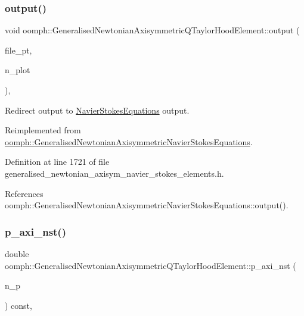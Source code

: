 \subsubsection{\texorpdfstring{output()}{output()}\hspace{0.1cm}{\footnotesize\ttfamily [4/4]}}
{\footnotesize\ttfamily void oomph\+::\+Generalised\+Newtonian\+Axisymmetric\+Q\+Taylor\+Hood\+Element\+::output (\begin{DoxyParamCaption}\item[{F\+I\+LE $\ast$}]{file\+\_\+pt,  }\item[{const unsigned \&}]{n\+\_\+plot }\end{DoxyParamCaption})\hspace{0.3cm}{\ttfamily [inline]}, {\ttfamily [virtual]}}



Redirect output to \hyperlink{classoomph_1_1NavierStokesEquations}{Navier\+Stokes\+Equations} output. 



Reimplemented from \hyperlink{classoomph_1_1GeneralisedNewtonianAxisymmetricNavierStokesEquations_a9aae32c881c1c55c2d20c579bf5438f7}{oomph\+::\+Generalised\+Newtonian\+Axisymmetric\+Navier\+Stokes\+Equations}.



Definition at line 1721 of file generalised\+\_\+newtonian\+\_\+axisym\+\_\+navier\+\_\+stokes\+\_\+elements.\+h.



References oomph\+::\+Generalised\+Newtonian\+Axisymmetric\+Navier\+Stokes\+Equations\+::output().

\mbox{\label{classoomph_1_1GeneralisedNewtonianAxisymmetricQTaylorHoodElement_aaabd34755d0ea72214bb7cdd9cd4a7e6}} 
\subsubsection{\texorpdfstring{p\+\_\+axi\+\_\+nst()}{p\_axi\_nst()}}
{\footnotesize\ttfamily double oomph\+::\+Generalised\+Newtonian\+Axisymmetric\+Q\+Taylor\+Hood\+Element\+::p\+\_\+axi\+\_\+nst (\begin{DoxyParamCaption}\item[{const unsigned \&}]{n\+\_\+p }\end{DoxyParamCaption}) const\hspace{0.3cm}{\ttfamily [inline]}, {\ttfamily [virtual]}}



